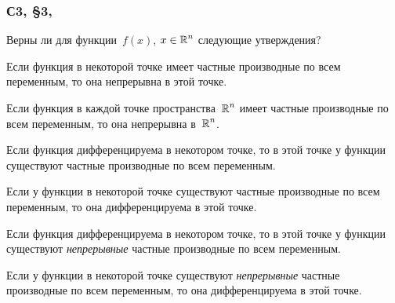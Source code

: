 \documentclass[a4paper,12pt]{article}
\newcommand{\cmark}{\ding{51}}
\newcommand{\xmark}{\ding{55}}
\newcommand{\hxmark}{$\smallsetminus\!\!\!\smallsetminus$}  %
\newcommand{\done}{
  \rlap{$\square$}{\raisebox{2pt}{\large\hspace{1pt}\cmark}}%
  \hspace{-2.5pt}
}
\newcommand{\failed}{
  \rlap{$\square$}{\large\hspace{1pt}\xmark}
}
\newcommand{\halffailed}{
  \rlap{$\square$}{%
    \raisebox{0pt}{\Large\hspace{1pt}\hxmark}
  }%
  \hspace{-2.5pt}
}
\begin{document}
  \subsubsection{С3, \S 3, }\label{sec:s3-par3-12}

  Верны ли для функции~$f(x)$, $x \hm\in \RR^n$ следующие утверждения?

  \begin{todolist}
      \item[\halffailed] Если функция в некоторой точке имеет частные производные по всем переменным, то она непрерывна в этой точке.

      \item[\halffailed] Если функция в каждой точке пространства~$\operatorname{\mathbb R}^n$ имеет частные производные по всем переменным, то она непрерывна в~$\operatorname{\mathbb R}^n$.
      
      \item[\done] Если функция дифференцируема в некотором точке, то в этой точке у функции существуют частные производные по всем переменным.

      \item[\halffailed] Если у функции в некоторой точке существуют частные производные по всем переменным, то она дифференцируема в этой точке.
      
      \item[\failed] Если функция дифференцируема в некотором точке, то в этой точке у функции существуют \emph{непрерывные} частные производные по всем переменным.

      \item[\done] Если у функции в некоторой точке существуют \emph{непрерывные} частные производные по всем переменным, то она дифференцируема в этой точке.
    \end{todolist}
  
\end{document}
